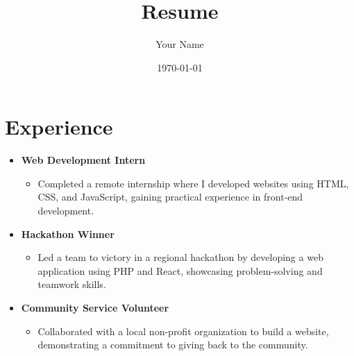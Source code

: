\documentclass{article}
\begin{document}
\title{Resume}
\author{Your Name}
\date{\today}
\maketitle

\section*{Experience}
\begin{itemize}[leftmargin=*]
    \item \textbf{Web Development Intern}
    \begin{itemize}
        \item Completed a remote internship where I developed websites using HTML, CSS, and JavaScript, gaining practical experience in front-end development.
    \end{itemize}
    
    \item \textbf{Hackathon Winner}
    \begin{itemize}
        \item Led a team to victory in a regional hackathon by developing a web application using PHP and React, showcasing problem-solving and teamwork skills.
    \end{itemize}
    
    \item \textbf{Community Service Volunteer}
    \begin{itemize}
        \item Collaborated with a local non-profit organization to build a website, demonstrating a commitment to giving back to the community.
    \end{itemize}
\end{itemize}
\end{document}
